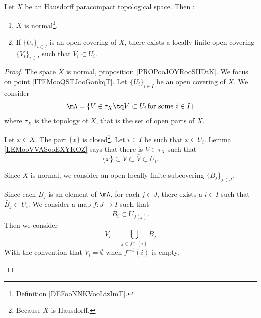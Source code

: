 \begin{lemma}	\label{LEMooKDPXooDixeXt}
	Let \( X\) be an Hausdorff paracompact topological space. Then :
	\begin{enumerate}
		\item
		      \( X\) is normal\footnote{Definition \ref{DEFooNNKVooLtzImT}.}.
		\item		\label{ITEMooQSTJooGankqT}
		      If \( \{ U_i \}_{i\in I}\) is an open covering of \( X\), there exists a locally finite open covering \( \{ V_i \}_{i\in I}\) such that \( \bar V_i\subset U_i\).
	\end{enumerate}
\end{lemma}

\begin{proof}
	The space \( X\) is normal, proposition \ref{PROPooJOYRooSIIDtK}. We focus on point \ref{ITEMooQSTJooGankqT}. Let \( \{ U_i \}_{i\in I}\) be an open covering of \( X\). We consider
	\begin{equation}
		\mA=\{ V\in \tau_X\tq\bar V\subset U_i\,\text{for some \( i\in I\)}\}
	\end{equation}
	where \( \tau_X\) is the topology of \( X\), that is the set of open parts of \( X\).
	\begin{subproof}
		\spitem[\( \mA\) is a covering of \( X\)]
		Let \( x\in X\). The part \( \{ x \}\) is closed\footnote{Because \( X\) is Hausdorff.}. Let \( i\in I\) be such that \( x\in U_i\). Lemma \ref{LEMooVVASooEXYKOZ} says that there is \( V\in\tau_X\) such that
		\begin{equation}
			\{ x \}\subset V\subset \bar V\subset U_i.
		\end{equation}

		\spitem[Subcovering]
		Since \( X\) is normal, we consider an open locally finite subcovering \( \{ B_j \}_{j\in J}\).

		Since each \( B_j\) is an element of \( \mA\), for each \(j\in J\), there exists a \( i\in I\) such that \( \bar B_j\subset U_i\). We consider a map \(f \colon J\to I  \) such that
		\begin{equation}
			\bar B_i\subset U_{f(j)}.
		\end{equation}
		Then we consider
		\begin{equation}
			V_i=\bigcup_{j\in f^{-1}(i)}B_j
		\end{equation}
		With the convention that \( V_i=\emptyset\) when \( f^{-1}(i)\) is empty.


\end{subproof}
\end{proof}

